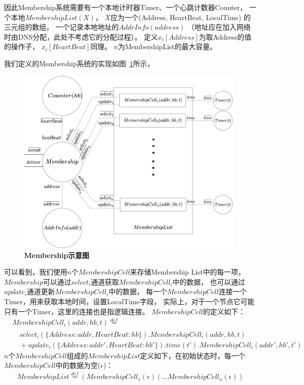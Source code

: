 因此Membership系统需要有一个本地计时器Timer、一个心跳计数器Counter，
一个本地$MembershipList(X)$，
$X$应为一个(Address, HeartBeat, LocalTime)
的三元组的数组，
一个记录本地地址的$AddrInfo(address)$
（地址应在加入网络时由DNS分配，此处不考虑它的分配过程）。
定义$x_i[Address]$为取Address的值的操作子，
$x_i[HeartBeat]$同理。
$n$为MembershipList的最大容量。

我们定义的Membership系统的实现如图~\ref{fig:membership_system}所示，
\begin{figure}[!htbp]
	\small
	\centering
	\includegraphics[width=11cm]{../figures/membership.png}
    \caption{\textbf{Membership示意图}}
    \label{fig:membership_system}
\end{figure}
可以看到，我们使用$n$个$MembershipCell$来存储Membership List中的每一项，
$Membership$可以通过$select_i$通道获取$MembershipCell_i$中的数据，
也可以通过$update_i$通道更新$MembershipCell_i$中的数据，
每一个$MembershipCell$连接一个Timer，用来获取本地时间，设置LocalTime字段，
实际上，对于一个节点它可能只有一个Timer，这里的连接也是指逻辑连接。
$MembershipCell$的定义如下：
\begin{align*}
   &MembershipCell_i(addr,hb,t)\stackrel{def}{=}\\
   &\quad\overline{select_i}(\{Address:addr,HeartBeat:hb\}).MembershipCell_i(addr,hb,t)\\
   &\quad+update_i(\{Address:addr',HeartBeat:hb'\}).time(t').MembershipCell_i(addr',hb',t')
\end{align*}
$n$个$MembershipCell$组成的$MembershipList$定义如下，在初始状态时，每一个$MembershipCell$中的数据为空($\epsilon$)：
\begin{align*}
   MembershipList\stackrel{def}{=}(MembershipCell_1(\epsilon)\mid \dots MembershipCell_n(\epsilon))
\end{align*}

